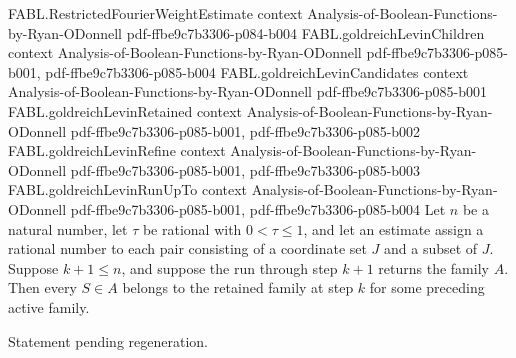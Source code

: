 \begin{theorem}
\proofstep
  {FABL.RestrictedFourierWeightEstimate}
  {context}
  {Analysis-of-Boolean-Functions-by-Ryan-ODonnell}
  {pdf-ffbe9c7b3306-p084-b004}
\proofstep
  {FABL.goldreichLevinChildren}
  {context}
  {Analysis-of-Boolean-Functions-by-Ryan-ODonnell}
  {pdf-ffbe9c7b3306-p085-b001,
    pdf-ffbe9c7b3306-p085-b004}
\proofstep
  {FABL.goldreichLevinCandidates}
  {context}
  {Analysis-of-Boolean-Functions-by-Ryan-ODonnell}
  {pdf-ffbe9c7b3306-p085-b001}
\proofstep
  {FABL.goldreichLevinRetained}
  {context}
  {Analysis-of-Boolean-Functions-by-Ryan-ODonnell}
  {pdf-ffbe9c7b3306-p085-b001,
    pdf-ffbe9c7b3306-p085-b002}
\proofstep
  {FABL.goldreichLevinRefine}
  {context}
  {Analysis-of-Boolean-Functions-by-Ryan-ODonnell}
  {pdf-ffbe9c7b3306-p085-b001,
    pdf-ffbe9c7b3306-p085-b003}
\proofstep
  {FABL.goldreichLevinRunUpTo}
  {context}
  {Analysis-of-Boolean-Functions-by-Ryan-ODonnell}
  {pdf-ffbe9c7b3306-p085-b001,
    pdf-ffbe9c7b3306-p085-b004}
Let $n$ be a natural number, let $\tau$ be rational with $0<\tau\le 1$, and let an
estimate assign a rational number to each pair consisting of a coordinate set $J$ and a
subset of $J$. Suppose $k+1\le n$, and suppose the run through step $k+1$ returns the
family $A$. Then every $S\in A$ belongs to the retained family at step $k$ for some
preceding active family.
\end{theorem}

\begin{theorem}
\label{FABL.goldreichLevinOutput_complete_of_accurate}
\leanok
{}
Statement pending regeneration.
\end{theorem}

